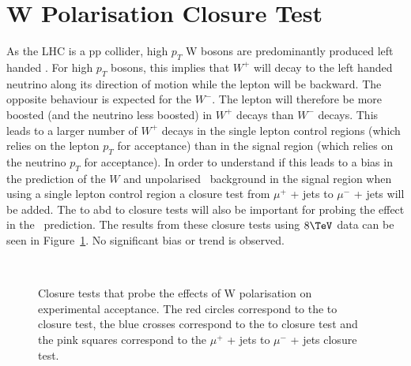 \clearpage
\section{W Polarisation Closure Test\label{app:wpol}}

As the LHC is a pp collider, high $p_T$ W bosons are predominantly
produced left handed \cite{WPol}.  For high $p_T$ bosons, this implies
that $W^+$ will decay to the left handed neutrino along its direction
of motion while the lepton will be backward. The opposite behaviour is
expected for the $W^-$. The lepton will therefore be more boosted (and
the neutrino less boosted) in $W^+$ decays than $W^-$ decays.  This
leads to a larger number of $W^+$ decays in the single lepton control
regions (which relies on the lepton $p_T$ for acceptance) than in the
signal region (which relies on the neutrino $p_T$ for acceptance). In
order to understand if this leads to a bias in the prediction of the
$W$ and unpolarised \zInv\ background in the signal region when using
a single lepton control region a closure test from $\mu^+$ + jets to
$\mu^-$ + jets will be added.  The \mj to \mmj abd \mj to \gj closure 
tests will also be important for probing the effect in the \zInv\ prediction. 
The results from these closure tests using $8\TeV$ data can be seen in
Figure~\ref{fig:wpolCT}.  No significant bias or trend is observed.

\begin{figure}[h!]
 \begin{center}  
   ~~
  \caption{Closure tests that probe the effects of W polarisation on
    experimental acceptance. The red circles correspond to the \mj to
    \mmj closure test, the blue crosses correspond to the \mj to \gj closure test
     and the pink squares correspond to the
    $\mu^+$ + jets to $\mu^-$ + jets closure test.}
  \label{fig:wpolCT}
 \end{center}
\end{figure}          
